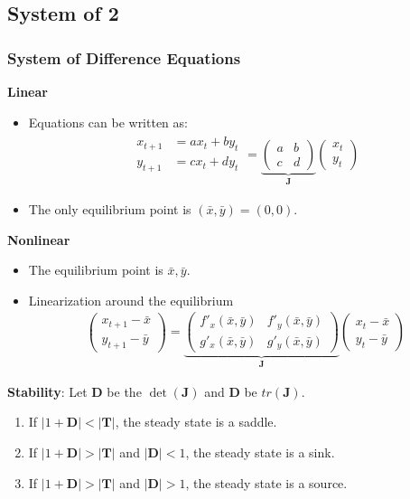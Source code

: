\documentclass[
10pt, %
]{beamer}
\begin{document}
\subsection{System of 2}
\begin{frame}
  \frametitle{System of Difference Equations}
  \textbf{Linear}
  \begin{itemize}
    \item Equations can be written as:
    \begin{align*}
      \begin{matrix}
      	x_{t+1} &= a x_t + b y_t \\
      y_{t+1} &= c x_t + d y_t
      \end{matrix}
      =
      \underbrace{\begin{pmatrix}
			a & b \\ c & d
		\end{pmatrix}}_{\mathbf{J}}
		\begin{pmatrix}
			x_{t}  \\
			y_{t} 
		\end{pmatrix}
    \end{align*}
    \item The only equilibrium point is $(\bar{x}, \bar{y}) = (0,0)$.
    \end{itemize}
  \textbf{Nonlinear}
  \begin{itemize}
  	\item The equilibrium point is $\bar{x},\bar{y}$.
  	\item Linearization around the equilibrium
  	\begin{align*}
		\begin{pmatrix}
			x_{t+1} - \bar{x} \\ y_{t+1} - \bar{y}
		\end{pmatrix}
		=  
		\underbrace{\begin{pmatrix}
			f'_x (\bar{x},\bar{y}) & f'_y (\bar{x},\bar{y}) \\ g'_x (\bar{x},\bar{y}) & g'_y (\bar{x},\bar{y})
		\end{pmatrix}}_{\mathbf{J}}
		\begin{pmatrix}
			x_{t} - \bar{x} \\ y_{t} - \bar{y}
		\end{pmatrix}
	\end{align*}
  \end{itemize}
  \textbf{Stability}: Let $\mathbf{D}$ be the $\det(\mathbf{J})$ and $\mathbf{D}$ be $tr(\mathbf{J})$.
	\begin{enumerate}
			\item If $| 1 + \mathbf{D} | < |\mathbf{T}|$, the steady state is a saddle. 
			\item If $|1+\mathbf{D}| > |\mathbf{T}|$ and $|\mathbf{D}| < 1$, the steady state is a sink.
			\item If $|1+\mathbf{D}| > |\mathbf{T}|$ and $|\mathbf{D}| > 1$, the steady state is a source.
	\end{enumerate}
\end{frame}
\end{document}
